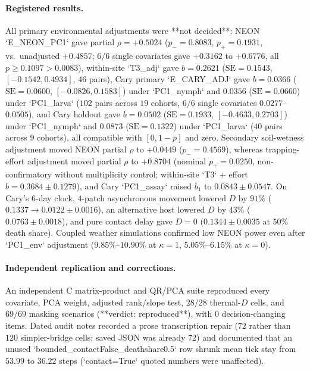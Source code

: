 \paragraph{Registered results.}
All primary environmental adjustments were **not decided**: NEON `E\_NEON\_PC1` gave partial $\rho = +0.5024$ ($p_- = 0.8083$, $p_+ = 0.1931$, vs.\ unadjusted $+0.4857$; $6/6$ single covariates gave $+0.3162$ to $+0.6776$, all $p \ge 0.1097 > 0.0083$), within-site `T3\_adj` gave $b = 0.2621$ ($\mathrm{SE} = 0.1543$, $[-0.1542, 0.4934]$, $46$ pairs), Cary primary `E\_CARY\_ADJ` gave $b = 0.0366$ ($\mathrm{SE} = 0.0600$, $[-0.0826, 0.1583]$) under `PC1\_nymph` and $0.0356$ ($\mathrm{SE} = 0.0660$) under `PC1\_larva` ($102$ pairs across $19$ cohorts, $6/6$ single covariates $0.0277$--$0.0505$), and Cary holdout gave $b = 0.0502$ ($\mathrm{SE} = 0.1933$, $[-0.4633, 0.2703]$) under `PC1\_nymph` and $0.0873$ ($\mathrm{SE} = 0.1322$) under `PC1\_larva` ($40$ pairs across $9$ cohorts), all compatible with $[0, 1 - \bar{p}]$ and zero. Secondary soil-wetness adjustment moved NEON partial $\rho$ to $+0.0449$ ($p_- = 0.4569$), whereas trapping-effort adjustment moved partial $\rho$ to $+0.8704$ (nominal $p_+ = 0.0250$, non-confirmatory without multiplicity control; within-site `T3` + effort $b = 0.3684 \pm 0.1279$), and Cary `PC1\_assay` raised $b_1$ to $0.0843 \pm 0.0547$. On Cary's 6-day clock, $4$-patch asynchronous movement lowered $D$ by $91\%$ ($0.1337 \to 0.0122 \pm 0.0016$), an alternative host lowered $D$ by $43\%$ ($0.0763 \pm 0.0018$), and pure contact delay gave $D = 0$ ($0.1344 \pm 0.0035$ at $50\%$ death share). Coupled weather simulations confirmed low NEON power even after `PC1\_env` adjustment ($9.85\%$--$10.90\%$ at $\kappa = 1$, $5.05\%$--$6.15\%$ at $\kappa = 0$).

\paragraph{Independent replication and corrections.}
An independent C matrix-product and QR/PCA suite reproduced every covariate, PCA weight, adjusted rank/slope test, $28/28$ thermal-$D$ cells, and $69/69$ masking scenarios (**verdict: reproduced**), with $0$ decision-changing items. Dated audit notes recorded a prose transcription repair ($72$ rather than $120$ simpler-bridge cells; saved JSON was already $72$) and documented that an unused `bounded\_contactFalse\_deathshare0.5` row shrunk mean tick stay from $53.99$ to $36.22$ steps (`contact=True` quoted numbers were unaffected).

